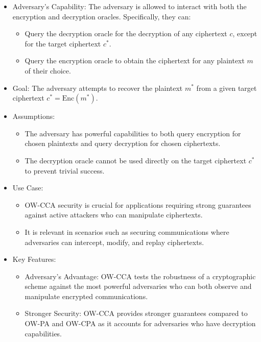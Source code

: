 \begin{itemize}
    \item Adversary's Capability:
    The adversary is allowed to interact with both the encryption and decryption oracles. Specifically, they can:
    \begin{itemize}
        \item Query the decryption oracle for the decryption of any ciphertext \( c \), except for the target ciphertext \( c^* \).
        \item Query the encryption oracle to obtain the ciphertext for any plaintext \( m \) of their choice.
    \end{itemize}
    
    \item Goal:
    The adversary attempts to recover the plaintext \( m^* \) from a given target ciphertext \( c^* = \text{Enc}(m^*) \).

    \item Assumptions:
    \begin{itemize}
        \item The adversary has powerful capabilities to both query encryption for chosen plaintexts and query decryption for chosen ciphertexts.
        \item The decryption oracle cannot be used directly on the target ciphertext \( c^* \) to prevent trivial success.
    \end{itemize}

    \item Use Case:
    \begin{itemize}
        \item OW-CCA security is crucial for applications requiring strong guarantees against active attackers who can manipulate ciphertexts.
        \item It is relevant in scenarios such as securing communications where adversaries can intercept, modify, and replay ciphertexts.
    \end{itemize}

    \item Key Features:
    \begin{itemize}
        \item Adversary's Advantage: OW-CCA tests the robustness of a cryptographic scheme against the most powerful adversaries who can both observe and manipulate encrypted communications.
        \item Stronger Security: OW-CCA provides stronger guarantees compared to OW-PA and OW-CPA as it accounts for adversaries who have decryption capabilities.
    \end{itemize}
\end{itemize}

